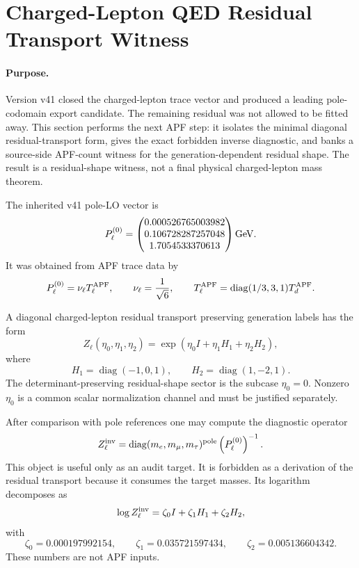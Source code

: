 
\section{Charged-Lepton QED Residual Transport Witness}\label{sec:charged-lepton-qed-residual-transport-v42}

\paragraph{Purpose.}
Version v41 closed the charged-lepton trace vector and produced a leading pole-codomain export candidate.  The remaining residual was not allowed to be fitted away.  This section performs the next APF step: it isolates the minimal diagonal residual-transport form, gives the exact forbidden inverse diagnostic, and banks a source-side APF-count witness for the generation-dependent residual shape.  The result is a residual-shape witness, not a final physical charged-lepton mass theorem.

\begin{definition}\label{def:v41-pole-lo-vector-v42}
The inherited v41 pole-LO vector is
\[
  P_\ell^{(0)}
  =
  \begin{pmatrix}
  0.000526765003982\\
  0.106728287257048\\
  1.7054533370613
  \end{pmatrix}{\rm GeV}.
\]
It was obtained from APF trace data by
\[
  P_\ell^{(0)}=\nu_\ell T_\ell^{\rm APF},
  \qquad \nu_\ell={1\over\sqrt6},
  \qquad
  T_\ell^{\rm APF}=\operatorname{diag}(1/3,3,1)T_d^{\rm APF}.
\]
\end{definition}

\begin{definition}\label{def:qed-residual-cartan-v42}
A diagonal charged-lepton residual transport preserving generation labels has the form
\[
  Z_\ell(\eta_0,\eta_1,\eta_2)
  =\exp(\eta_0 I+\eta_1 H_1+\eta_2 H_2),
\]
where
\[
  H_1=\operatorname{diag}(-1,0,1),
  \qquad
  H_2=\operatorname{diag}(1,-2,1).
\]
The determinant-preserving residual-shape sector is the subcase \(\eta_0=0\).  Nonzero \(\eta_0\) is a common scalar normalization channel and must be justified separately.
\end{definition}

\begin{gate}\label{gate:forbidden-inverse-qed-residual-v42}
After comparison with pole references one may compute the diagnostic operator
\[
  Z_\ell^{\rm inv}
  =\operatorname{diag}(m_e,m_\mu,m_\tau)^{\rm pole}
  \left(P_\ell^{(0)}\right)^{-1}.
\]
This object is useful only as an audit target.  It is forbidden as a derivation of the residual transport because it consumes the target masses.  Its logarithm decomposes as
\[
  \log Z_\ell^{\rm inv}
  =\zeta_0 I+\zeta_1 H_1+\zeta_2 H_2,
\]
with
\[
  \zeta_0=0.000197992154,
  \qquad
  \zeta_1=0.035721597434,
  \qquad
  \zeta_2=0.005136604342.
\]
These numbers are not APF inputs.
\end{gate}

